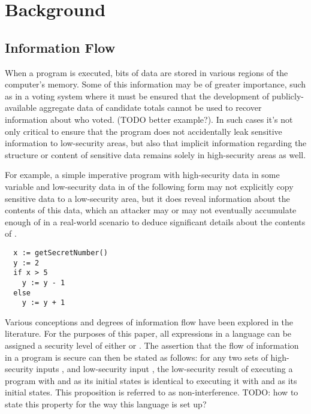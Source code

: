 \documentclass[12pt]{report}
\begin{document}
\chapter{Background}



\section{Information Flow}



 When a program is executed, bits of data are stored in various
regions of the computer's memory. Some of this information may be of
greater importance, such as in a voting system where it must be
ensured that the development of publicly-available aggregate data of
candidate totals cannot be used to recover information about who
voted. (TODO better example?). In such cases it's not only critical
to ensure that the program does not accidentally leak sensitive
information to low-security areas, but also that implicit information
regarding the structure or content of sensitive data remains solely
in high-security areas as well.


For example, a simple imperative program with high-security data in
some variable  and low-security data in  of the following form
may not explicitly copy sensitive data to a low-security area, but it
does reveal information about the contents of this data, which an
attacker may or may not eventually accumulate enough of in
a real-world scenario to deduce significant details about the
contents of .


\begin{verbatim}
  x := getSecretNumber()
  y := 2
  if x > 5
    y := y - 1
  else
    y := y + 1
\end{verbatim}


 Various conceptions and degrees of information flow have been
explored in the literature. For the purposes of this paper, all
expressions in a language can be assigned a security level of either
 or . The assertion that the flow of information in
a program is secure can then be stated as follows: for any two sets
of high-security inputs ,  and low-security input , the
low-security result of executing a program with  and  as its
initial states is identical to executing it with  and  as its
initial states. This proposition is referred to as
non-interference. TODO: how to state this property for the way this
language is set up? 
\end{document}
